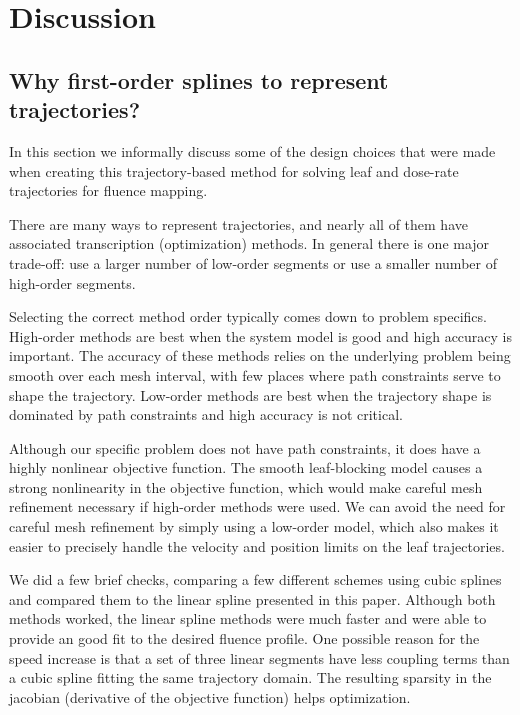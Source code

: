 \section{Discussion}

\subsection{Why first-order splines to represent trajectories?}

In this section we informally discuss some of the design choices that were made when creating this
trajectory-based method for solving leaf and dose-rate trajectories for fluence mapping.


There are many ways to represent trajectories, and nearly all of them have associated transcription (optimization) methods.
In general there is one major trade-off:
use a larger number of low-order segments or
use a smaller number of high-order segments.

Selecting the correct method order typically comes down to problem specifics.
High-order methods are best when the system model is good and high accuracy is important.
The accuracy of these methods relies on the underlying problem being smooth over each
mesh interval, with few places where path constraints serve to shape the trajectory.
Low-order methods are best when the trajectory shape is dominated by path constraints and
high accuracy is not critical.

Although our specific problem does not have path constraints, it does have a highly nonlinear objective function.
The smooth leaf-blocking model causes a strong nonlinearity in the objective function,
which would make careful mesh refinement necessary if high-order methods were used.
We can avoid the need for careful mesh refinement by simply using a low-order model,
which also makes it easier to precisely handle the velocity and position limits on the leaf trajectories.

We did a few brief checks, comparing a few different schemes using cubic splines and compared them
to the linear spline presented in this paper. Although both methods worked, the linear spline methods
were much faster and were able to provide an good fit to the desired fluence profile.
One possible reason for the speed increase is that a set of three linear segments have less
coupling terms than a cubic spline fitting the same trajectory domain. The resulting sparsity in the
jacobian (derivative of the objective function) helps optimization. \cite{Betts}

